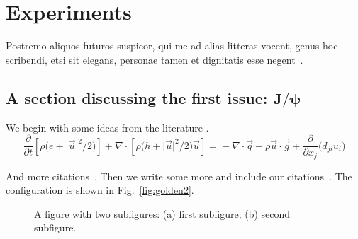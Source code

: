 

\chapter{Experiments}

\lipsum[1-2] Postremo aliquos futuros suspicor, qui me ad alias litteras vocent, genus hoc scribendi, etsi sit elegans, personae tamen et dignitatis esse negent~\cite{DKE1969,ww1920,kirk2288a,churchill1948,gibbs1863}.

\section[A section discussing the first issue: \(J/\psi\)]{A section discussing the first issue: \ifpdftex\(\bm{J}/\bm{\psi}\)\fi}


We begin with some ideas from the literature \cite{Fong2015,sharpe1}. 
\begin{equation}
\frac{\partial}{\partial t}\left[\rho\bigl(e + \lvert\vec{u}\rvert^2\big/2\bigr)\right]  + \nabla\cdot\left[\rho\bigl(h + \lvert\vec{u}\rvert^2\big/2 \bigr)\vec{u}\right]
 ={}-\nabla \cdot \vec{q} +  \rho \vec{u}\cdot\vec{g}+ \frac{\partial}{\partial x_j}\bigl(d_{ji}u_i\bigr)
\end{equation}
 \lipsum[3]

\lipsum[4] And more citations~\cite{sharpe1,GSL}.  Then we write some more and include our citations~\cite{Swaminathan2017IDABRO,dlmf,amsmath}. The configuration is shown in Fig.~\ref{fig:golden2}.

\begin{figure}[t]
\begin{subfigure}[c]{0.495\textwidth}
%
\subcaption{\label{fig:golden}}
\end{subfigure}
\begin{subfigure}[c]{0.495\textwidth}
%
\subcaption{\label{fig:golden2}}%
\end{subfigure}%
\caption{A figure with two subfigures: (a) first subfigure; (b) second subfigure.\label{fig:4}}
\end{figure}

